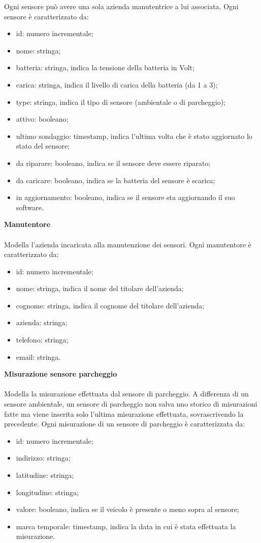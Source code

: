 Ogni sensore può avere una sola azienda manutentrice a lui associata.
Ogni sensore è caratterizzato da:
\begin{itemize}
    \item id: numero incrementale;
    \item nome: stringa;
    \item batteria: stringa, indica la tensione della batteria in Volt;
    \item carica: stringa, indica il livello di carica della batteria (da 1 a 3);
    \item type: stringa, indica il tipo di sensore (ambientale o di parcheggio);
    \item attivo: booleano;
    \item ultimo sondaggio: timestamp, indica l'ultima volta che è stato aggiornato lo stato del sensore;
    \item da riparare: booleano, indica se il sensore deve essere riparato;
    \item da caricare: booleano, indica se la batteria del sensore è scarica;
    \item in aggiornamento: booleano, indica se il sensore sta aggiornando il suo software.
\end{itemize}
\leavevmode\newline
\textbf{Manutentore}
\\\\
Modella l'azienda incaricata alla manutenzione dei sensori.
Ogni manutentore è caratterizzato da:
\begin{itemize}
    \item id: numero incrementale;
    \item nome: stringa, indica il nome del titolare dell'azienda;
    \item cognome: stringa, indica il cognome del titolare dell'azienda;
    \item azienda: stringa;
    \item telefono: stringa;
    \item email: stringa.
\end{itemize}
\leavevmode\newline
\textbf{Misurazione sensore parcheggio}
\\\\
Modella la misurazione effettuata dal sensore di parcheggio. A differenza di un sensore ambientale, un sensore
di parcheggio non salva uno storico di misurazioni fatte ma viene inserita solo l'ultima misurazione effettuata,
sovrascrivendo la precedente.
Ogni misurazione di un sensore di parcheggio è caratterizzata da:
\begin{itemize}
    \item id: numero incrementale;
    \item indirizzo: stringa;
    \item latitudine: stringa;
    \item longitudine: stringa;
    \item valore: booleano, indica se il veicolo è presente o meno sopra al sensore;
    \item marca temporale: timestamp, indica la data in cui è stata effettuata la misurazione.
\end{itemize}

